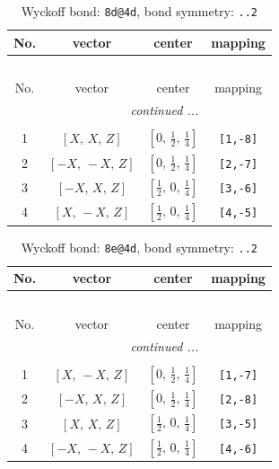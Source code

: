 \documentclass[fleqn,8pt]{jsarticle}
\begin{document}
\begin{longtable}{cccc}
\caption{Wyckoff bond: {\tt 8d@4d}, bond symmetry: {\tt ..2}}
 \\
 \hline \hline
No. & vector & center & mapping \\ \hline \endfirsthead

\multicolumn{3}{l}{\tablename\ \thetable{}} \\
 \hline \hline
No. & vector & center & mapping \\ \hline \endhead

 \hline \hline
\multicolumn{3}{r}{\footnotesize\it continued ...} \\ \endfoot

 \hline \hline
\multicolumn{3}{r}{} \\ \endlastfoot

1 & $\left[ X,\, X,\, Z \right]$ & $\left[ 0,\, \frac{1}{2},\, \frac{1}{4} \right]$ & {\tt [1,-8]} \\ \hline
2 & $\left[ - X,\, - X,\, Z \right]$ & $\left[ 0,\, \frac{1}{2},\, \frac{1}{4} \right]$ & {\tt [2,-7]} \\ \hline
3 & $\left[ - X,\, X,\, Z \right]$ & $\left[ \frac{1}{2},\, 0,\, \frac{1}{4} \right]$ & {\tt [3,-6]} \\ \hline
4 & $\left[ X,\, - X,\, Z \right]$ & $\left[ \frac{1}{2},\, 0,\, \frac{1}{4} \right]$ & {\tt [4,-5]} \\
\end{longtable}
\renewcommand{\arraystretch}{1.2}
\begin{longtable}{cccc}
\caption{Wyckoff bond: {\tt 8e@4d}, bond symmetry: {\tt ..2}}
 \\
 \hline \hline
No. & vector & center & mapping \\ \hline \endfirsthead

\multicolumn{3}{l}{\tablename\ \thetable{}} \\
 \hline \hline
No. & vector & center & mapping \\ \hline \endhead

 \hline \hline
\multicolumn{3}{r}{\footnotesize\it continued ...} \\ \endfoot

 \hline \hline
\multicolumn{3}{r}{} \\ \endlastfoot

1 & $\left[ X,\, - X,\, Z \right]$ & $\left[ 0,\, \frac{1}{2},\, \frac{1}{4} \right]$ & {\tt [1,-7]} \\ \hline
2 & $\left[ - X,\, X,\, Z \right]$ & $\left[ 0,\, \frac{1}{2},\, \frac{1}{4} \right]$ & {\tt [2,-8]} \\ \hline
3 & $\left[ X,\, X,\, Z \right]$ & $\left[ \frac{1}{2},\, 0,\, \frac{1}{4} \right]$ & {\tt [3,-5]} \\ \hline
4 & $\left[ - X,\, - X,\, Z \right]$ & $\left[ \frac{1}{2},\, 0,\, \frac{1}{4} \right]$ & {\tt [4,-6]} \\
\end{longtable}
\end{document}
